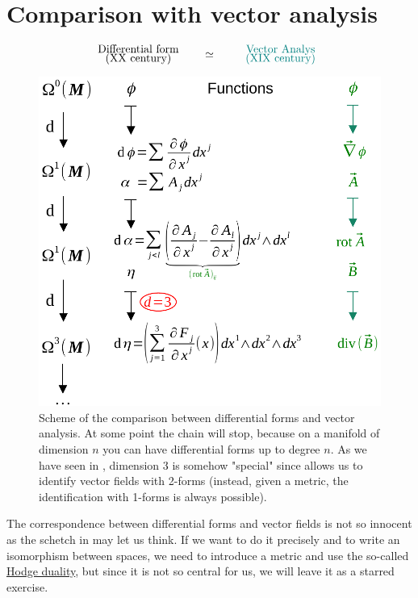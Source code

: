 \documentclass[../main.tex]{subfiles}
\begin{document}
\section{Comparison with vector analysis}
\[
\text{\parbox{4 cm}{\centering Differential form \\[-4pt]  {(XX century)}}}\simeq\text{\parbox{4 cm}{\color{teal} \centering Vector Analys \\[-4pt]  (XIX century)}}
\]
\begin{figure}[H]
	\includegraphics{images/schema_confronto_diff_analisi.pdf}
	\caption{Scheme of the comparison between differential forms and vector analysis. At some point the chain will stop, because on a manifold of dimension $n$ you can have differential forms up to degree $n$. As we have seen in , dimension $3$ is somehow "special" since allows us to identify vector fields with 2-forms (instead, given a metric, the identification with 1-forms is always possible).}
\end{figure}
The correspondence between differential forms and vector fields is not so innocent as the schetch in  may let us think. If we want to do it precisely and to write an isomorphism between spaces, we need to introduce a metric and use the so-called \href{https://en.wikipedia.org/wiki/Hodge_star_operator}{Hodge duality}, but since it is not so central for us, we will leave it as a starred exercise.\\
\end{document}
